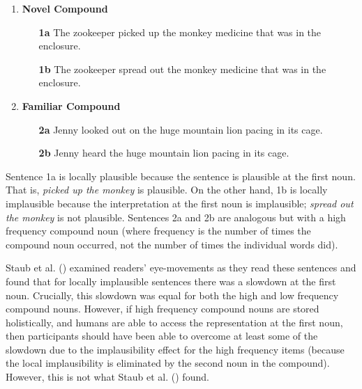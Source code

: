 \documentclass[
  12pt,
  letterpaper,
]{scrreprt}
\begin{document}
\begin{enumerate} 

    \item \textbf{Novel Compound}
    \begin{enumerate}
        \item[\textbf{1a}] The zookeeper picked up the monkey medicine that was in the enclosure.
        \item[\textbf{1b}] The zookeeper spread out the monkey medicine that was in the enclosure.
    \end{enumerate} \label{staubsentencenovel}
    \item \textbf{Familiar Compound}
    \begin{enumerate}
        \item[\textbf{2a}] Jenny looked out on the huge mountain lion pacing in its cage. \label{familiarplaus}
        \item[\textbf{2b}] Jenny heard the huge mountain lion pacing in its cage. \label{familiarimplaus}
    \end{enumerate} \label{staubsentencefamiliar}
\end{enumerate}

Sentence 1a is locally plausible because the sentence is plausible at
the first noun. That is, \emph{picked up the monkey} is plausible. On
the other hand, 1b is locally implausible because the interpretation at
the first noun is implausible; \emph{spread out the monkey} is not
plausible. Sentences 2a and 2b are analogous but with a high frequency
compound noun (where frequency is the number of times the compound noun
occurred, not the number of times the individual words did).

Staub et al. ()
examined readers' eye-movements as they read these sentences and found
that for locally implausible sentences there was a slowdown at the first
noun. Crucially, this slowdown was equal for both the high and low
frequency compound nouns. However, if high frequency compound nouns are
stored holistically, and humans are able to access the representation at
the first noun, then participants should have been able to overcome at
least some of the slowdown due to the implausibility effect for the high
frequency items (because the local implausibility is eliminated by the
second noun in the compound). However, this is not what Staub et al.
() found.
\end{document}
